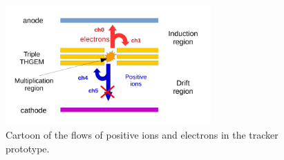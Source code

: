 \documentclass[a4paper, 11 pt]{report}
\begin{document}
\begin{figure}[htbp]
	\centering
	\includegraphics[width=0.7\textwidth]{Immagini/THGEMScheme.pdf}
	\caption{Cartoon of the flows of positive ions and electrons in the tracker prototype.}
	\label{fig:THGEMscheme}
\end{figure}
\end{document}
